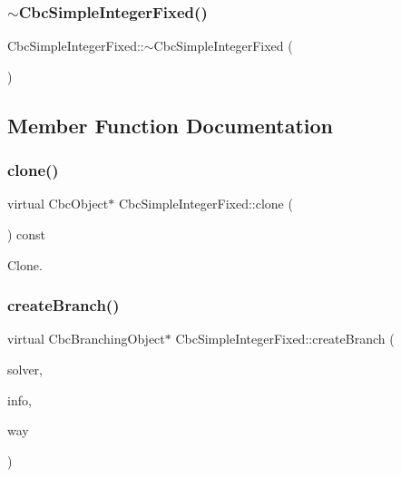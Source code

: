 \subsubsection{\texorpdfstring{$\sim$\+Cbc\+Simple\+Integer\+Fixed()}{~CbcSimpleIntegerFixed()}}
{\footnotesize\ttfamily Cbc\+Simple\+Integer\+Fixed\+::$\sim$\+Cbc\+Simple\+Integer\+Fixed (\begin{DoxyParamCaption}{ }\end{DoxyParamCaption})}



\subsection{Member Function Documentation}
\mbox{\label{classCbcSimpleIntegerFixed_a0738b48257886ddaf189f1fabd51d025}} 
\subsubsection{\texorpdfstring{clone()}{clone()}}
{\footnotesize\ttfamily virtual Cbc\+Object$\ast$ Cbc\+Simple\+Integer\+Fixed\+::clone (\begin{DoxyParamCaption}{ }\end{DoxyParamCaption}) const\hspace{0.3cm}{\ttfamily [virtual]}}



Clone. 

\mbox{\label{classCbcSimpleIntegerFixed_a2d30611fcda59c1503153689875e085e}} 
\subsubsection{\texorpdfstring{create\+Branch()}{createBranch()}}
{\footnotesize\ttfamily virtual Cbc\+Branching\+Object$\ast$ Cbc\+Simple\+Integer\+Fixed\+::create\+Branch (\begin{DoxyParamCaption}\item[{Osi\+Solver\+Interface $\ast$}]{solver,  }\item[{const Osi\+Branching\+Information $\ast$}]{info,  }\item[{int}]{way }\end{DoxyParamCaption})\hspace{0.3cm}{\ttfamily [virtual]}}




